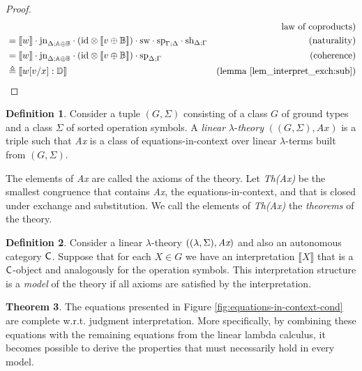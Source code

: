 \documentclass[10pt,a4paper]{amsart}
\theoremstyle{definition}
\newtheorem{definition}{Definition}[section]
\theoremstyle{definition}
\theoremstyle{definition}
\theoremstyle{definition}
\theoremstyle{definition}
\theoremstyle{definition}
\newtheorem{theorem}[definition]{Theorem}
\begin{document}
\begin{proof}
\begin{align*}
  & \hspace{10pt} & {\text{law of coproducts})}   \\
  & = \llbracket w \rrbracket \cdot \text{jn}_{\Delta;\mathbb{A} \oplus \mathbb{B}} \cdot ( \text{id} \otimes \llbracket v \oplus \mathbb{B}\rrbracket )  \cdot  \mathrm{sw}  \cdot  \text{sp}_{\Gamma;\Delta} \cdot \text{sh}_{\Delta;\Gamma}  & {\text{(naturality)}}\\
  &  = \llbracket w \rrbracket \cdot \text{jn}_{\Delta;\mathbb{A} \oplus \mathbb{B}} \cdot ( \text{id} \otimes \llbracket v \oplus \mathbb{B}\rrbracket )  \cdot  \text{sp}_{\Delta; \Gamma} & {\text{(coherence)}}\\
  & \triangleq \llbracket w[v/x] : \mathbb{D} \rrbracket & {\text{(lemma \ref{lem_interpret_exch:sub})}}
\end{align*}
\end{proof}

\begin{definition}
  Consider a tuple $(G, \Sigma)$ consisting of a class $G$ of ground types and a class $\Sigma$ of sorted operation symbols. A \emph{linear} $\lambda$-\emph{theory} $((G, \Sigma), \textit{Ax})$ is a triple such that \emph{Ax} is a class of equations-in-context over linear $\lambda$-terms built from $(G, \Sigma)$.
\end{definition}

The elements of \emph{Ax} are called the axioms of the theory. Let \emph{Th(Ax)}  be the smallest
congruence that contains \emph{Ax}, the equations-in-context, and that is closed under exchange
and substitution. We call the elements of  \emph{Th(Ax)} the \emph{theorems} of the theory.

\begin{definition}
  Consider a linear $\lambda$-theory $((\lambda, \Sigma), \emph{Ax})$ and
  also an autonomous category $\mathsf{C}$. Suppose that for each $X \in G$ we have an interpretation $\llbracket X \rrbracket$
  that is a $\mathsf{C}$-object and analogously for the operation symbols. This interpretation structure
  is a \emph{model} of the theory if all axioms are satisfied by the interpretation.
\end{definition}

\begin{theorem} \label {theorem:comp_eq_in_context}
  The equations presented in Figure \ref{fig:equations-in-context-cond} are complete w.r.t. judgment interpretation. More specifically, by combining these equations with the remaining equations from the linear lambda calculus, it becomes possible to derive the properties that must necessarily hold in every model.
\end{theorem}
\end{document}

